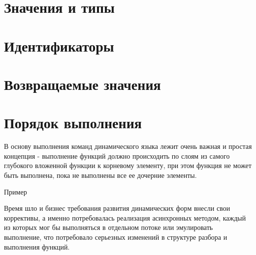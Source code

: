 \documentclass[10pt]{book}
\begin{document}
	\section{Значения и типы}
	
	\section{Идентификаторы}
	
	\section{Возвращаемые значения}
	
	\section{Порядок выполнения}
    \label{sec:execrules} 
        В основу выполнения команд динамического языка лежит очень важная и простая концепция - выполнение функций должно происходить по слоям из самого глубокого вложенной функции к корневому элементу, при этом функция не может быть выполнена, пока не выполнены все ее дочерние элементы.
        
        Пример
        
        Время шло и бизнес требования развития динамических форм внесли свои коррективы, а именно потребовалась реализация асинхронных методом, каждый из которых мог бы выполняться в отдельном потоке или эмулировать выполнение, что потребовало серьезных изменений в структуре разбора и выполнения функций.
        
\end{document}
